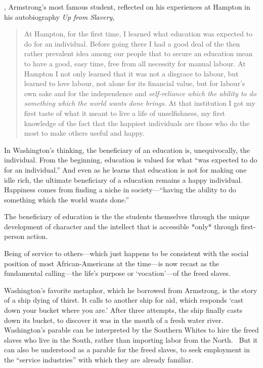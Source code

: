 , Armstrong's most famous student, reflected on his experiences at Hampton in his autobiography \emph{Up from Slavery,} 

\begin{quote}

At Hampton, for the first time, I learned what education was expected to do for an individual. Before going there I had a good deal of the then rather prevalent idea among our people that to secure an education mean to have a good, easy time, free from all necessity for manual labour. At Hampton I not only learned that it was not a disgrace to labour, but learned to love labour, not alone for its financial value, but for labour's own sake and for the independence and \emph{self-reliance which the ability to do something which the world wants done brings}. At that institution I got my first taste of what it meant to live a life of unselfishness, my first knowledge of the fact that the happiest individuals are those who do the most to make others useful and happy. ~\citep[p. 43]{Washington:1952uf}
\end{quote}

In Washington's thinking, the beneficiary of an education is, unequivocally, the individual. From the beginning, education is valued for what ``was expected to do for an individual.'' And even as he learns that education is not for making one idle rich, the ultimate beneficiary of a education remains a happy individual. Happiness comes from finding a niche in society---``having the ability to do something which the world wants done.'' \begin{objects}
\label{washingtonobjects}The beneficiary of education is the the students themselves through the unique development of character and the intellect that is accessible *only* through first-person action.
\end{objects}


Being of service to others---which just happens to be consistent with the social position of most African-Americans at the time---is now recast as the fundamental calling---the life's purpose or `vocation'---of the freed slaves. 

Washington's favorite metaphor, which he borrowed from Armstrong, is the story of a ship dying of thirst. It calls to another ship for aid, which responds `cast down your bucket where you are.' After three attempts, the ship finally casts down its bucket, to discover it was in the mouth of a fresh water river. Washington's parable can be interpreted by the Southern Whites to hire the freed slaves who live in the South, rather than importing labor from the North.~\citep[p. 23]{Spivey:1978un} But it can also be understood as a parable for the freed slaves, to seek employment in the ``service industries'' with which they are already familiar.

